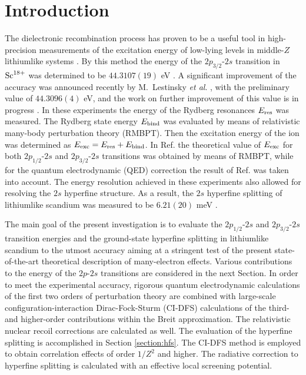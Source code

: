 \documentclass[preprint,aps,pra,showpacs,floatfix]{revtex4}
\newcommand{\Eres}{E_{\rm res}}
\newcommand{\Ebind}{E_{\rm bind}}
\newcommand{\Eexc}{E_{\rm exc}}
\begin{document}
\section{Introduction}
%
The dielectronic recombination process has proven to be a useful tool
in high-precision measurements of the excitation energy of low-lying levels
in middle-$Z$ lithiumlike systems \cite{madzunkov:PRA:02,kieslich:PRA:04}.
By this method the energy of the ${2p_{3/2}}$-${2s}$ transition in ${\rm Sc}^{18+}$
was determined to be $44.3107(19)$ eV \cite{kieslich:PRA:04}.
A significant improvement of the accuracy was announced recently by M.~Lestinsky
{\it et al}. \cite{les:EGAS,les:HCI}, with the preliminary value of $44.3096(4)$ eV,
and the work on further improvement of this value is in progress \cite{wolf:SPARC}.
In these experiments the energy of the Rydberg resonances $\Eres$ was measured.
The Rydberg state energy $\Ebind$ was evaluated by means of relativistic many-body
perturbation theory (RMBPT). Then the excitation energy of the ion was determined
as $\Eexc=\Eres+\Ebind$. In Ref. \cite{kieslich:PRA:04} the theoretical value
of $\Eexc$ for both ${2p_{1/2}}$-${2s}$ and ${2p_{3/2}}$-${2s}$ transitions
was obtained by means of RMBPT, while for the quantum electrodynamic (QED)
correction the result of Ref. \cite{kim:PRA:91} was taken into account.
The energy resolution achieved in these experiments also allowed for resolving
the $2s$ hyperfine structure. As a result, the $2s$ hyperfine splitting
of lithiumlike scandium was measured to be $6.21(20)$ meV \cite{les:HCI}.

The main goal of the present investigation is to evaluate the ${2p_{1/2}}$-${2s}$
and ${2p_{3/2}}$-${2s}$ transition energies and the ground-state hyperfine splitting
in lithiumlike scandium to the utmost accuracy aiming at a stringent test
of the present state-of-the-art theoretical description of many-electron effects.
Various contributions to the energy of the ${2p}$-${2s}$ transitions are considered
in the next Section. In order to meet the experimental accuracy, rigorous
quantum electrodynamic calculations of the first two orders of perturbation theory
are combined with large-scale configuration-interaction Dirac-Fock-Sturm (CI-DFS)
calculations of the third- and higher-order contributions within the Breit approximation.
The relativistic nuclear recoil corrections are calculated as well. The evaluation
of the hyperfine splitting is accomplished in Section \ref{section:hfs}. The CI-DFS
method is employed to obtain correlation effects of order $1/Z^2$ and higher.
The radiative correction to hyperfine splitting is calculated with an effective
local screening potential.
\end{document}
